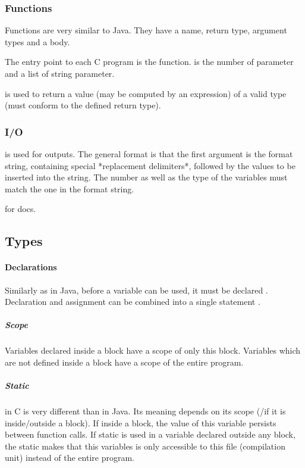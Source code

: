 \subsubsection{Functions}
Functions are very similar to Java. They have a name, return type, argument types and a body.


The entry point to each C program is the  function.  is the number of parameter and  a list of string parameter.

 is used to return a value (may be computed by an expression) of a valid type (must conform to the defined return type).

\subsubsection{I/O}
 is used for outputs. The general format is that the first argument is the format string, containing special *replacement delimiters*, followed by the values to be inserted into the string. The number as well as the type of the variables must match the one in the format string.

 for docs. 

\subsection*{Types}

\paragraph{Declarations}
Similarly as in Java, before a variable can be used, it must be declared . Declaration and assignment can be combined into a single statement .

\subparagraph{Scope}
Variables declared inside a block have a scope of only this block. Variables which are not defined inside a block have a scope of the entire program. 

\subparagraph{Static}
 in C is very different than in Java. Its meaning depends on its scope (/if it is inside/outside a block). If inside a block, the value of this variable persists between function calls. If static is used in a variable declared outside any block, the static makes that this variables is only accessible to this file (compilation unit) instead of the entire program.

